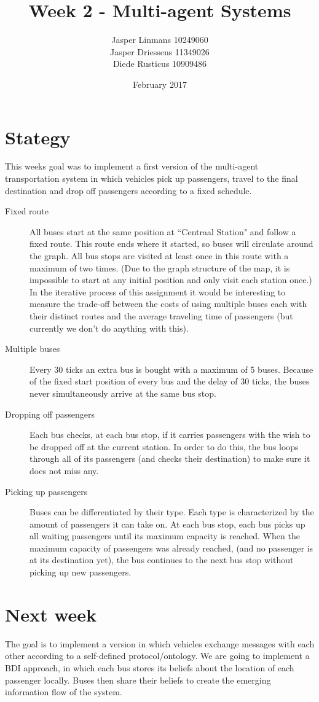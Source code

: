 \documentclass{article}
\title{Week 2 - Multi-agent Systems}
\author{Jasper Linmans 10249060\\Jasper Driessens 11349026\\Diede Rusticus 10909486}
\date{February 2017}
\begin{document}
\maketitle

\section*{Stategy}
This weeks goal was to implement a first version of the multi-agent transportation system in which vehicles
pick up passengers, travel to the final destination and drop off passengers according to a fixed schedule.
\begin{description}
\item[Fixed route]
    All buses start at the same position at ``Centraal Station" and follow a fixed route. This route ends where it started, so buses will circulate around the graph. All bus stops are visited at least once in this route with a maximum of two times. (Due to the graph structure of the map, it is impossible to start at any initial position and only visit each station once.) In the iterative process of this assignment it would be interesting to measure the trade-off between the costs of using multiple buses each with their distinct routes and the average traveling time of passengers (but currently we don't do anything with this).
\item[Multiple buses]
    Every 30 ticks an extra bus is bought with a maximum of 5 buses. Because of the fixed start position of every bus and the delay of 30 ticks, the buses never simultaneously arrive at the same bus stop.
\item[Dropping off passengers]
    Each bus checks, at each bus stop, if it carries passengers with the wish to be dropped off at the current station. In order to do this, the bus loops through all of its passengers (and checks their destination) to make sure it does not miss any.
\item[Picking up passengers]
    Buses can be differentiated by their type. Each type is characterized by the amount of passengers it can take on. At each bus stop, each bus picks up all waiting passengers until its maximum capacity is reached. When the maximum capacity of passengers was already reached, (and no passenger is at its destination yet), the bus continues to the next bus stop without picking up new passengers.
\end{description}

\section*{Next week}
    The goal is to implement a version in which vehicles exchange messages with each other according to a self-defined protocol/ontology. We are going to implement a BDI approach, in which each bus stores its beliefs about the location of each passenger locally. Buses then share their beliefs to create the emerging information flow of the system.
\end{document}
